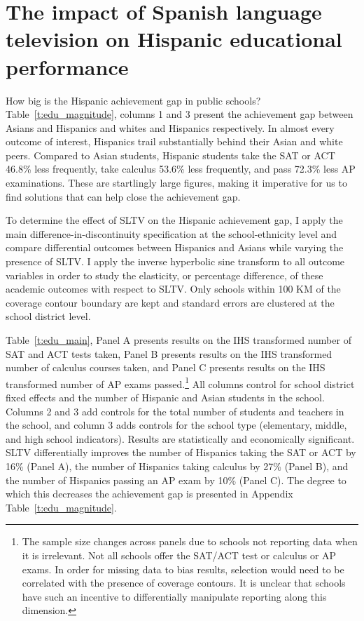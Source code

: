 \documentclass[11pt]{article}
\begin{document}


\section{The impact of Spanish language television on Hispanic educational performance}\label{s:school}

How big is the Hispanic achievement gap in public schools? Table~\ref{t:edu_magnitude}, columns 1 and 3 present the achievement gap between Asians and Hispanics and whites and Hispanics respectively. In almost every outcome of interest, Hispanics trail substantially behind their Asian and white peers. Compared to Asian students, Hispanic students take the SAT or ACT 46.8\% less frequently, take calculus 53.6\% less frequently, and pass 72.3\% less AP examinations. These are startlingly large figures, making it imperative for us to find solutions that can help close the achievement gap.

To determine the effect of SLTV on the Hispanic achievement gap, I apply the main difference-in-discontinuity specification at the school-ethnicity level and compare differential outcomes between Hispanics and Asians while varying the presence of SLTV. I apply the inverse hyperbolic sine transform to all outcome variables in order to study the elasticity, or percentage difference, of these academic outcomes with respect to SLTV. Only schools within 100 KM of the coverage contour boundary are kept and standard errors are clustered at the school district level. 
 
Table~\ref{t:edu_main}, Panel A presents results on the IHS transformed number of SAT and ACT tests taken, Panel B presents results on the IHS transformed number of calculus courses taken, and Panel C presents results on the IHS transformed number of AP exams passed.\footnote{ The sample size changes across panels due to schools not reporting data when it is irrelevant. Not all schools offer the SAT/ACT test or calculus or AP exams. In order for missing data to bias results, selection would need to be correlated with the presence of coverage contours. It is unclear that schools have such an incentive to differentially manipulate reporting along this dimension.} All columns control for school district fixed effects and the number of Hispanic and Asian students in the school. Columns 2 and 3 add controls for the total number of students and teachers in the school, and column 3 adds controls for the school type (elementary, middle, and high school indicators). Results are statistically and economically significant. SLTV differentially improves the number of Hispanics taking the SAT or ACT by 16\% (Panel A), the number of Hispanics taking calculus by 27\% (Panel B), and the number of Hispanics passing an AP exam by 10\% (Panel C). The degree to which this decreases the achievement gap is presented in Appendix Table~\ref{t:edu_magnitude}. 
\end{document}
